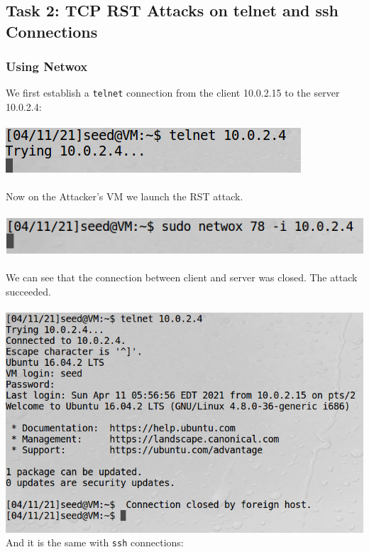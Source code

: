 \documentclass[a4paper]{article}
\begin{document}
\subsection{Task 2: TCP RST Attacks on telnet and ssh Connections}
\subsubsection{Using Netwox}
We first establish a \verb+telnet+ connection from the client 10.0.2.15 to the server 10.0.2.4:\\\\
\includegraphics[scale=0.7]{1/10.png}\\\\
Now on the Attacker's VM we launch the RST attack.\\\\
\includegraphics[scale=0.7]{1/11.png}\\\\
We can see that the connection between client and server was closed. The attack succeeded.\\\\
\pagebreak
\includegraphics[scale=0.7]{1/12.png}
\\And it is the same with \verb+ssh+ connections:\\\\
\end{document}
